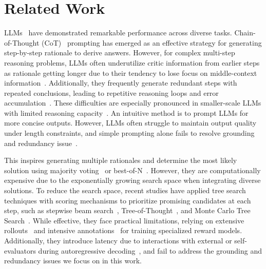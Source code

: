 \section{Related Work}
LLMs~\cite{openai2023gpt4, touvron2023llama, abdin2024phi, guo2025deepseek} have demonstrated remarkable performance across diverse tasks. Chain-of-Thought (CoT)~\cite{wei2022chain, zhou2022least} prompting has emerged as an effective strategy for generating step-by-step rationale to derive answers. However, for complex multi-step reasoning problems, LLMs often underutilize critic information from earlier steps as rationale getting longer due to their tendency to lose focus on middle-context information~\cite{peysakhovich2023attention, junqing2023never, hsieh2024found}. Additionally, they frequently generate redundant steps with repeated conclusions, leading to repetitive reasoning loops and error accumulation~\cite{dziri2024faith, furuta2024exposing}. These difficulties are especially pronounced in smaller-scale LLMs with limited reasoning capacity~\cite{fu2023specializing}.
An intuitive method is to prompt LLMs for more concise outputs. However, LLMs often struggle to maintain output quality under length constraints, and simple prompting alone fails to resolve grounding and redundancy issue~\cite{nayab2024concise, han2024token}. 

This inspires generating multiple rationales and determine the most likely solution using majority voting~\cite{wang2022self} or best-of-N~\cite{wang2024math}. However, they are computationally expensive due to the exponentially growing search space when integrating diverse solutions.
To reduce the search space, recent studies have applied tree search techniques with scoring mechanisms to prioritize promising candidates at each step, such as stepwise beam search~\cite{xie2024self}, Tree-of-Thought~\cite{yao2024tree}, and Monte Carlo Tree Search~\cite{jiang2024technical, feng2023alphazero, zhang2024rest}. While effective, they face practical limitations, relying on extensive rollouts~\cite{wang2024math, wang2024q} and intensive annotations~\cite{lightman2023let} for training specialized reward models. Additionally, they introduce latency due to interactions with external or self-evaluators during autoregressive decoding~\cite{xie2024self, yao2024tree}, and fail to address the grounding and redundancy issues we focus on in this work.